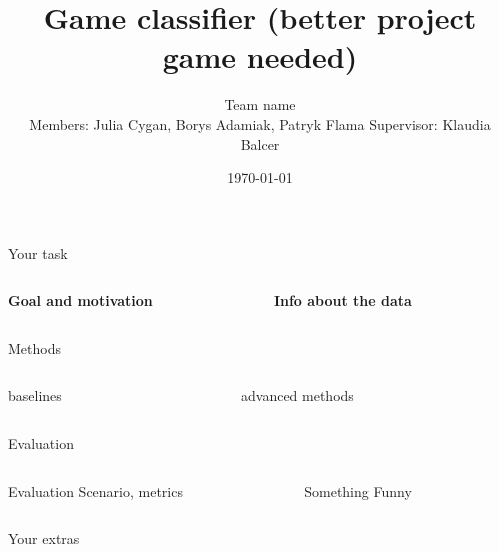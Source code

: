 \documentclass{beamer}
\title{Game classifier (better project game needed)}
\author[Team name]{Team name\\[5mm]
{\small Members: Julia Cygan, Borys Adamiak, Patryk Flama}
\hspace{18mm} 
{\small Supervisor: Klaudia Balcer}}
\institute{UWr}
\date{\today}
\begin{document}
\begin{frame}
\titlepage
\end{frame}


\begin{frame}[t]{Your task}

\begin{columns}
\begin{column}{0.5\textwidth}

{\bf Goal and motivation}

\end{column}
\begin{column}{0.5\textwidth}

{\bf Info about the data}

\end{column}
\end{columns}

\end{frame}


\begin{frame}[t]{Methods}

\begin{columns}
	\begin{column}{0.5\textwidth}
		baselines
	\end{column}
	\begin{column}{0.5\textwidth}
		advanced methods
	\end{column}
\end{columns}	

\end{frame}


\begin{frame}[t]{Evaluation}

\begin{columns}
	\begin{column}{0.5\textwidth}
		Evaluation Scenario, metrics
	\end{column}
	\begin{column}{0.5\textwidth}
		Something Funny
	\end{column}
\end{columns}

\end{frame}


\begin{frame}{Your extras}
\end{frame}
\end{document}
